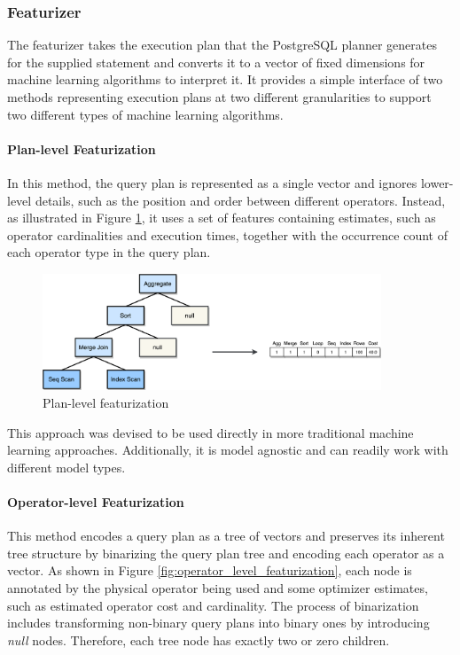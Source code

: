 \subsubsection{Featurizer}

The featurizer takes the execution plan that the PostgreSQL planner generates for the supplied statement and converts it to a vector of fixed dimensions for machine learning algorithms to interpret it. It provides a simple interface of two methods representing execution plans at two different granularities to support two different types of machine learning algorithms.

\paragraph{Plan-level Featurization}

In this method, the query plan is represented as a single vector and ignores lower-level details, such as the position and order between different operators. Instead, as illustrated in Figure \ref{fig:plan_level_featurization}, it uses a set of features containing estimates, such as operator cardinalities and execution times, together with the occurrence count of each operator type in the query plan.

\begin{figure}[H]
\centering
\includegraphics[width=0.9\textwidth]{img/solution/plan_level_featurization.png}
\caption{Plan-level featurization}
\label{fig:plan_level_featurization}
\end{figure}

This approach was devised to be used directly in more traditional machine learning approaches. Additionally, it is model agnostic and can readily work with different model types.

\paragraph{Operator-level Featurization}

This method encodes a query plan as a tree of vectors and preserves its inherent tree structure by binarizing the query plan tree and encoding each operator as a vector. As shown in Figure \ref{fig:operator_level_featurization}, each node is annotated by the physical operator being used and some optimizer estimates, such as estimated operator cost and cardinality. The process of binarization includes transforming non-binary query plans into binary ones by introducing \textit{null} nodes. Therefore, each tree node has exactly two or zero children. 

